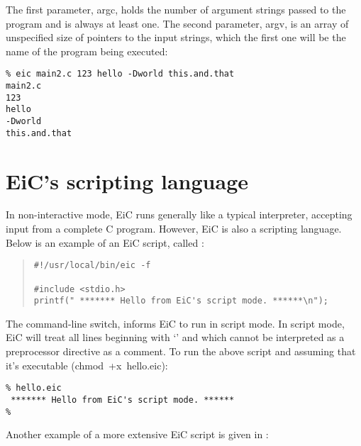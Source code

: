 \documentclass[12pt]{report}
\begin{document}
The first parameter, argc, holds the number of argument strings passed
to the program and is always at least one. The second parameter, argv,
is an array of unspecified size of pointers to the input strings,
which the first one will be the name of the program being executed:

\begin{production}
\begin{verbatim}
% eic main2.c 123 hello -Dworld this.and.that
main2.c
123
hello
-Dworld
this.and.that
\end{verbatim}
\end{production}

\section{EiC's scripting language}

In non-interactive mode, EiC runs generally like a typical
interpreter, accepting input from a complete C program. However, EiC
is also a scripting language.  Below is an example of
an EiC script, called :
\begin{quote} 
\begin{verbatim}
#!/usr/local/bin/eic -f

#include <stdio.h>
printf(" ******* Hello from EiC's script mode. ******\n");
\end{verbatim}
\end{quote}
The  command-line switch, informs EiC to run in script mode.  In
script mode, EiC will treat all lines beginning with `\T{\#}' and
which cannot be interpreted as a preprocessor directive
as a comment. To run the above script and
assuming that it's executable (chmod~+x~hello.eic):

\begin{production}
\begin{verbatim}
% hello.eic
 ******* Hello from EiC's script mode. ******
%
\end{verbatim}
\end{production}

Another example of a more extensive EiC script is given in
:
\end{document}
